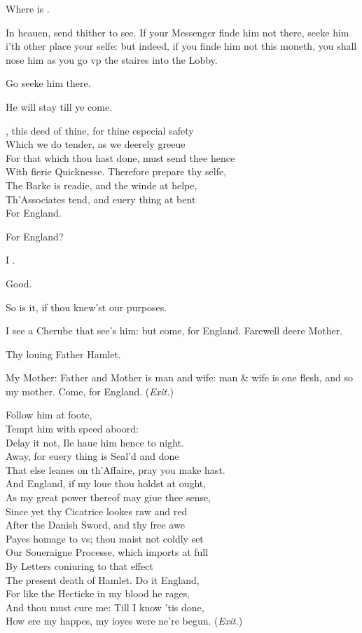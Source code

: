 \documentclass[a5paper,DIV=calc,11pt]{scrbook}
\begin{document}
\begin{drama*}
    \kingspeaks Where is \pol.
    
    \hamspeaks In heauen, send thither to see. If your Messenger finde him not there, seeke him i'th other place your selfe: but indeed, if you finde him not this moneth, you shall nose him as you go vp the staires into the Lobby.
    
    \kingspeaks Go seeke him there.
    
    \hamspeaks He will stay till ye come.
    
    \kingspeaks \ham, this deed of thine, for thine especial safety\\
    Which we do tender, as we deerely greeue\\
    For that which thou hast done, must send thee hence\\
    With fierie Quicknesse. Therefore prepare thy selfe,\\
    The Barke is readie, and the winde at helpe,\\
    Th'Associates tend, and euery thing at bent\\
    For England.
    
    \hamspeaks For England?
    
    \kingspeaks I \ham.
    
    \hamspeaks Good.
    
    \kingspeaks So is it, if thou knew'st our purposes.
    
    \hamspeaks I see a Cherube that see's him: but come, for England. Farewell deere Mother.
    
    \kingspeaks Thy louing Father Hamlet.
    
    \hamspeaks My Mother: Father and Mother is man and wife: man \& wife is one flesh, and so my mother. Come, for England. \hfill(\textit{Exit.})
    
    \kingspeaks Follow him at foote,\\
    Tempt him with speed aboord:\\
    Delay it not, Ile haue him hence to night.\\
    Away, for euery thing is Seal'd and done\\
    That else leanes on th'Affaire, pray you make hast.\\
    And England, if my loue thou holdst at ought,\\
    As my great power thereof may giue thee sense,\\
    Since yet thy Cicatrice lookes raw and red\\
    After the Danish Sword, and thy free awe\\
    Payes homage to vs; thou maist not coldly set\\
    Our Soueraigne Processe, which imports at full\\
    By Letters coniuring to that effect\\
    The present death of Hamlet. Do it England,\\
    For like the Hecticke in my blood he rages,\\
    And thou must cure me: Till I know 'tis done,\\
    How ere my happes, my ioyes were ne're begun. \hfill(\textit{Exit.})
\end{drama*}
\end{document}
